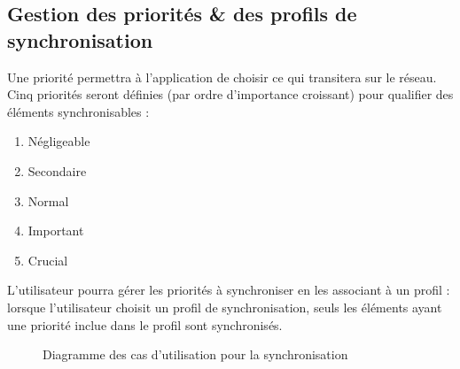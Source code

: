 \subsection{Gestion des priorités \& des profils de synchronisation}
Une priorité permettra à l'application de \og{}choisir\fg{} ce qui transitera sur le réseau. Cinq priorités seront définies (par ordre d'importance croissant) pour qualifier des éléments synchronisables :
\begin{enumerate}
    \item Négligeable
    \item Secondaire
    \item Normal
    \item Important
    \item Crucial
\end{enumerate}
L'utilisateur pourra gérer les priorités à synchroniser en les associant à un profil : lorsque l'utilisateur choisit un profil de synchronisation, seuls les éléments ayant une priorité inclue dans le profil sont synchronisés.
\begin{figure}[htbp]
    \centering
	\caption{Diagramme des cas d'utilisation pour la synchronisation}
	\label{ucsynchro}
\end{figure}

